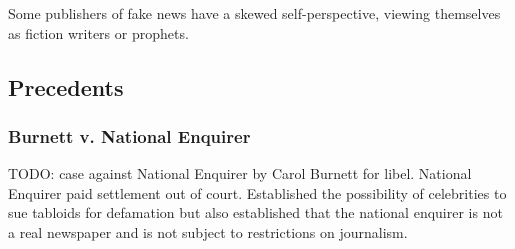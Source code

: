 \par Some publishers of fake news have a skewed self-perspective, viewing themselves as fiction writers or prophets. \cite{cbs_fake_news}

%
%
\subsection{Precedents}

\subsubsection{Burnett v. National Enquirer}

\par TODO: case against National Enquirer by Carol Burnett for libel. National Enquirer paid settlement out of court. Established the possibility of celebrities to sue tabloids for defamation but also established that the national enquirer is not a real newspaper and is not subject to restrictions on journalism.
\cite{burnett_v_ne}
